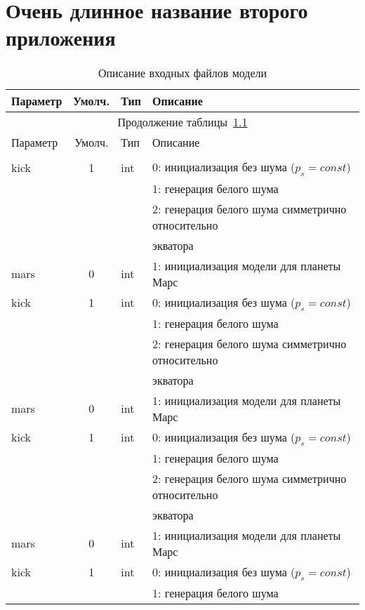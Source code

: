 \documentclass[14pt]{extreport}
\begin{document}
\chapter{Очень длинное название второго приложения \label{AppendixB}}


\fontsize{10pt}{10pt}\selectfont
\begin{longtable}[c]{|l|c|l|l|}
\caption{Описание входных файлов модели}\label{Namelists}
\\ \hline
 Параметр & Умолч. & Тип & Описание               \\ \hline
 \endfirsthead   \hline
 \multicolumn{4}{|c|}{Продолжение таблицы~\ref{Namelists}}        \\ \hline
 Параметр & Умолч. & Тип & Описание               \\ \hline
 \endhead        \hline
 \endfoot        \hline
 \multicolumn{4}{|c|}{Параметров \&INP}        \\ \hline 
 kick & 1 & int & 0: инициализация без шума ($p_s = const$) \\
      &   &     & 1: генерация белого шума                  \\
      &   &     & 2: генерация белого шума симметрично относительно \\
  & & & экватора    \\
 mars & 0 & int & 1: инициализация модели для планеты Марс     \\
 kick & 1 & int & 0: инициализация без шума ($p_s = const$) \\
      &   &     & 1: генерация белого шума                  \\
      &   &     & 2: генерация белого шума симметрично относительно \\
  & & & экватора    \\
 mars & 0 & int & 1: инициализация модели для планеты Марс     \\
kick & 1 & int & 0: инициализация без шума ($p_s = const$) \\
      &   &     & 1: генерация белого шума                  \\
      &   &     & 2: генерация белого шума симметрично относительно \\
  & & & экватора    \\
 mars & 0 & int & 1: инициализация модели для планеты Марс     \\
kick & 1 & int & 0: инициализация без шума ($p_s = const$) \\
      &   &     & 1: генерация белого шума                  \\

\end{longtable}
\end{document}
